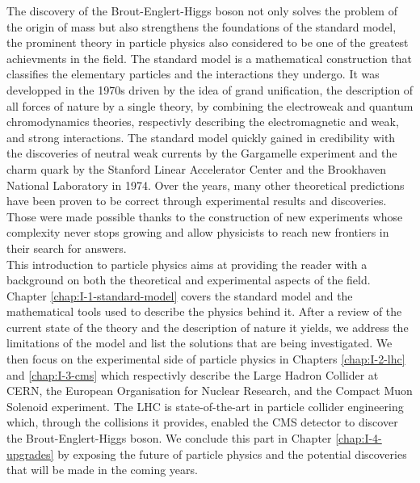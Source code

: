 The discovery of the Brout-Englert-Higgs boson not only solves the problem of the origin of mass but also strengthens the foundations of the standard model, the prominent theory in particle physics also considered to be one of the greatest achievments in the field. The standard model is a mathematical construction that classifies the elementary particles and the interactions they undergo. It was developped in the 1970s driven by the idea of grand unification, the description of all forces of nature by a single theory, by combining the electroweak and quantum chromodynamics theories, respectivly describing the electromagnetic and weak, and strong interactions. The standard model quickly gained in credibility with the discoveries of neutral weak currents by the Gargamelle experiment and the charm quark by the Stanford Linear Accelerator Center and the Brookhaven National Laboratory in 1974. Over the years, many other theoretical predictions have been proven to be correct through experimental results and discoveries. Those were made possible thanks to the construction of new experiments whose complexity never stops growing and allow physicists to reach new frontiers in their search for answers. \\

This introduction to particle physics aims at providing the reader with a background on both the theoretical and experimental aspects of the field. Chapter \ref{chap:I-1-standard-model} covers the standard model and the mathematical tools used to describe the physics behind it. After a review of the current state of the theory and the description of nature it yields, we address the limitations of the model and list the solutions that are being investigated. We then focus on the experimental side of particle physics in Chapters \ref{chap:I-2-lhc} and \ref{chap:I-3-cms} which respectivly describe the Large Hadron Collider at CERN, the European Organisation for Nuclear Research, and the Compact Muon Solenoid experiment. The LHC is state-of-the-art in particle collider engineering which, through the collisions it provides, enabled the CMS detector to discover the Brout-Englert-Higgs boson. We conclude this part in Chapter \ref{chap:I-4-upgrades} by exposing the future of particle physics and the potential discoveries that will be made in the coming years.
